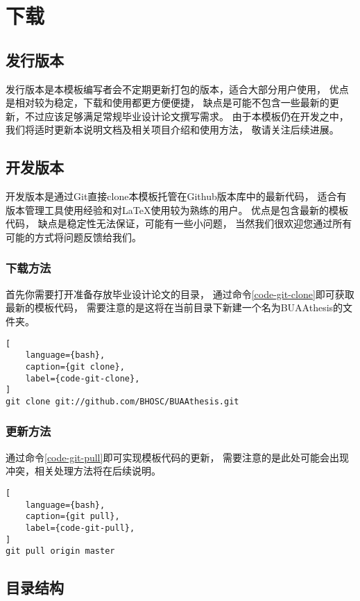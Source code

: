 \chapter{下载}

\section{发行版本}

发行版本是本模板编写者会不定期更新打包的版本，适合大部分用户使用，
优点是相对较为稳定，下载和使用都更方便便捷，
缺点是可能不包含一些最新的更新，不过应该足够满足常规毕业设计论文撰写需求。
由于本模板仍在开发之中，我们将适时更新本说明文档及相关项目介绍和使用方法，
敬请关注后续进展。

\section{开发版本}

开发版本是通过Git直接clone本模板托管在Github版本库中的最新代码，
适合有版本管理工具使用经验和对LaTeX使用较为熟练的用户。
优点是包含最新的模板代码，
缺点是稳定性无法保证，可能有一些小问题，
当然我们很欢迎您通过所有可能的方式将问题反馈给我们。

\subsection{下载方法}
首先你需要打开准备存放毕业设计论文的目录，
通过命令\ref{code-git-clone}即可获取最新的模板代码，
需要注意的是这将在当前目录下新建一个名为BUAAthesis的文件夹。
\begin{lstlisting}[
    language={bash},
    caption={git clone},
    label={code-git-clone},
]
git clone git://github.com/BHOSC/BUAAthesis.git
\end{lstlisting}

\subsection{更新方法}
通过命令\ref{code-git-pull}即可实现模板代码的更新，
需要注意的是此处可能会出现冲突，相关处理方法将在后续说明。
\begin{lstlisting}[
    language={bash},
    caption={git pull},
    label={code-git-pull},
]
git pull origin master
\end{lstlisting}

\section{目录结构}

